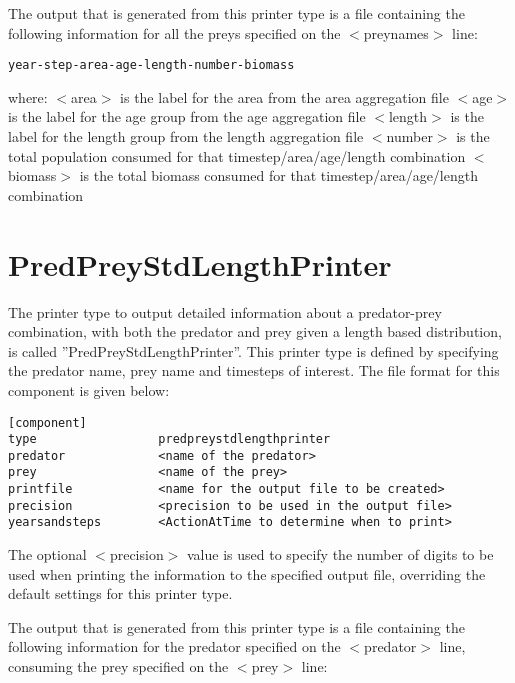 \documentclass[10pt,twoside]{book}
\begin{document}
\bigskip
The output that is generated from this printer type is a file containing the following information for all the preys specified on the $<$preynames$>$ line:

{\small\begin{verbatim}
year-step-area-age-length-number-biomass
\end{verbatim}}

where:\newline
$<$area$>$ is the label for the area from the area aggregation file\newline
$<$age$>$ is the label for the age group from the age aggregation file\newline
$<$length$>$ is the label for the length group from the length aggregation file\newline
$<$number$>$ is the total population consumed for that timestep/area/age/length combination\newline
$<$biomass$>$ is the total biomass consumed for that timestep/area/age/length combination

\section{PredPreyStdLengthPrinter}\label{sec:predpreystdlengthprinter}
The printer type to output detailed information about a predator-prey combination, with both the predator and prey given a length based distribution, is called ''PredPreyStdLengthPrinter''.  This printer type is defined by specifying the predator name, prey name and timesteps of interest.  The file format for this component is given below:

{\small\begin{verbatim}
[component]
type                 predpreystdlengthprinter
predator             <name of the predator>
prey                 <name of the prey>
printfile            <name for the output file to be created>
precision            <precision to be used in the output file>
yearsandsteps        <ActionAtTime to determine when to print>
\end{verbatim}}

The optional $<$precision$>$ value is used to specify the number of digits to be used when printing the information to the specified output file, overriding the default settings for this printer type.

\bigskip
The output that is generated from this printer type is a file containing the following information for the predator specified on the $<$predator$>$ line, consuming the prey specified on the $<$prey$>$ line:
\end{document}
